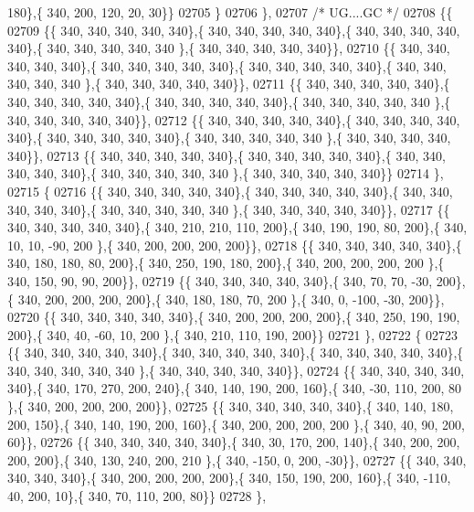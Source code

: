 \begin{DoxyCode}
      180\},\{ 340, 200, 120,  20,  30\}\}
02705 \}
02706 \},
02707 \textcolor{comment}{/* UG....GC */}
02708 \{\{
02709 \{\{ 340, 340, 340, 340, 340\},\{ 340, 340, 340, 340, 340\},\{ 340, 340, 340, 340, 340\},\{ 340, 340, 340, 340, 340
      \},\{ 340, 340, 340, 340, 340\}\},
02710 \{\{ 340, 340, 340, 340, 340\},\{ 340, 340, 340, 340, 340\},\{ 340, 340, 340, 340, 340\},\{ 340, 340, 340, 340, 340
      \},\{ 340, 340, 340, 340, 340\}\},
02711 \{\{ 340, 340, 340, 340, 340\},\{ 340, 340, 340, 340, 340\},\{ 340, 340, 340, 340, 340\},\{ 340, 340, 340, 340, 340
      \},\{ 340, 340, 340, 340, 340\}\},
02712 \{\{ 340, 340, 340, 340, 340\},\{ 340, 340, 340, 340, 340\},\{ 340, 340, 340, 340, 340\},\{ 340, 340, 340, 340, 340
      \},\{ 340, 340, 340, 340, 340\}\},
02713 \{\{ 340, 340, 340, 340, 340\},\{ 340, 340, 340, 340, 340\},\{ 340, 340, 340, 340, 340\},\{ 340, 340, 340, 340, 340
      \},\{ 340, 340, 340, 340, 340\}\}
02714 \},
02715 \{
02716 \{\{ 340, 340, 340, 340, 340\},\{ 340, 340, 340, 340, 340\},\{ 340, 340, 340, 340, 340\},\{ 340, 340, 340, 340, 340
      \},\{ 340, 340, 340, 340, 340\}\},
02717 \{\{ 340, 340, 340, 340, 340\},\{ 340, 210, 210, 110, 200\},\{ 340, 190, 190,  80, 200\},\{ 340,  10,  10, -90, 200
      \},\{ 340, 200, 200, 200, 200\}\},
02718 \{\{ 340, 340, 340, 340, 340\},\{ 340, 180, 180,  80, 200\},\{ 340, 250, 190, 180, 200\},\{ 340, 200, 200, 200, 200
      \},\{ 340, 150,  90,  90, 200\}\},
02719 \{\{ 340, 340, 340, 340, 340\},\{ 340,  70,  70, -30, 200\},\{ 340, 200, 200, 200, 200\},\{ 340, 180, 180,  70, 200
      \},\{ 340,   0, -100, -30, 200\}\},
02720 \{\{ 340, 340, 340, 340, 340\},\{ 340, 200, 200, 200, 200\},\{ 340, 250, 190, 190, 200\},\{ 340,  40, -60,  10, 200
      \},\{ 340, 210, 110, 190, 200\}\}
02721 \},
02722 \{
02723 \{\{ 340, 340, 340, 340, 340\},\{ 340, 340, 340, 340, 340\},\{ 340, 340, 340, 340, 340\},\{ 340, 340, 340, 340, 340
      \},\{ 340, 340, 340, 340, 340\}\},
02724 \{\{ 340, 340, 340, 340, 340\},\{ 340, 170, 270, 200, 240\},\{ 340, 140, 190, 200, 160\},\{ 340, -30, 110, 200,  80
      \},\{ 340, 200, 200, 200, 200\}\},
02725 \{\{ 340, 340, 340, 340, 340\},\{ 340, 140, 180, 200, 150\},\{ 340, 140, 190, 200, 160\},\{ 340, 200, 200, 200, 200
      \},\{ 340,  40,  90, 200,  60\}\},
02726 \{\{ 340, 340, 340, 340, 340\},\{ 340,  30, 170, 200, 140\},\{ 340, 200, 200, 200, 200\},\{ 340, 130, 240, 200, 210
      \},\{ 340, -150,   0, 200, -30\}\},
02727 \{\{ 340, 340, 340, 340, 340\},\{ 340, 200, 200, 200, 200\},\{ 340, 150, 190, 200, 160\},\{ 340, -110,  40, 200,  
      10\},\{ 340,  70, 110, 200,  80\}\}
02728 \},

\end{DoxyCode}
